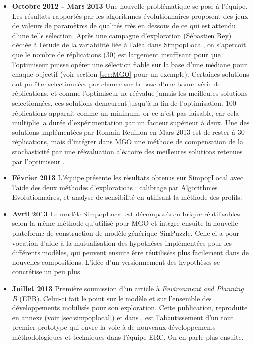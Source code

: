 \begin{itemize}[label=\textbullet]
\item {\textbf{Octobre 2012 - Mars 2013}} Une nouvelle problématique se pose à l'équipe. Les résultats rapportés par les algorithmes évolutionnaires proposent des jeux de valeurs de paramètres de qualités très en dessous de ce qui est attendu d'une telle sélection. Après une campagne d'exploration (Sébastien Rey) dédiée à l'étude de la variabilité liée à l'aléa dans SimpopLocal, on s'apercoit que le nombre de réplications ($30$) est largement insuffisant pour que l'optimiseur puisse opérer une sélection fiable sur la base d'une médiane pour chaque objectif (voir section \ref{sec:MGO} pour un exemple). Certaines solutions ont pu être selectionnées par chance sur la base d'une bonne série de réplications, et comme l'optimiseur ne réévalue jamais les meilleures solutions selectionnées, ces solutions demeurent jusqu'à la fin de l'optimisation. $100$ réplications apparait comme un minimum, or ce n'est pas faisable, car cela multiplie la durée d'expérimentation par un facteur supérieur à deux. Une des solutions implémentées par Romain Reuillon en Mars 2013 est de rester à $30$ réplications, mais d'intégrer dans MGO une méthode de compensation de la stochasticité par une réévaluation aléatoire des meilleures solutions retenues par l'optimiseur \autocite{Pietro2004}.

\item {\textbf{Février 2013}} L'équipe présente les résultats obtenus sur SimpopLocal avec l'aide des deux méthodes d'explorations : calibrage par Algorithmes Evolutionnaires, et analyse de sensibilité en utilisant la méthode des profils.

\item {\textbf{Avril 2013}} Le modèle SimpopLocal est décomposés en brique réutilisables selon la même méthode qu'utilisé pour MGO et intègre ensuite la nouvelle plateforme de construction de modèle générique SimPuzzle. Celle-ci a pour vocation d'aide à la mutualisation des hypothèses implémentées pour les différents modèles, qui peuvent ensuite être réutilisées plus facilement dans de nouvelles compositions. L'idée d'un versionnement des hypothèses se concrétise un peu plus.

\item {\textbf{Juillet 2013}} Première soumission d'un article à \textit{Environment and Planning B} (EPB). Celui-ci fait le point sur le modèle et sur l'ensemble des développements mobilisés pour son exploration. Cette publication, reproduite en annexe (voir \ref{sec:simpoplocal}) et dans \textcite{Schmitt2015}, est l'aboutissement d'un tout premier prototype qui ouvre la voie à de nouveaux développements méthodologiques et techniques dans l'équipe ERC. On en parle plus ensuite.

\end{itemize}

